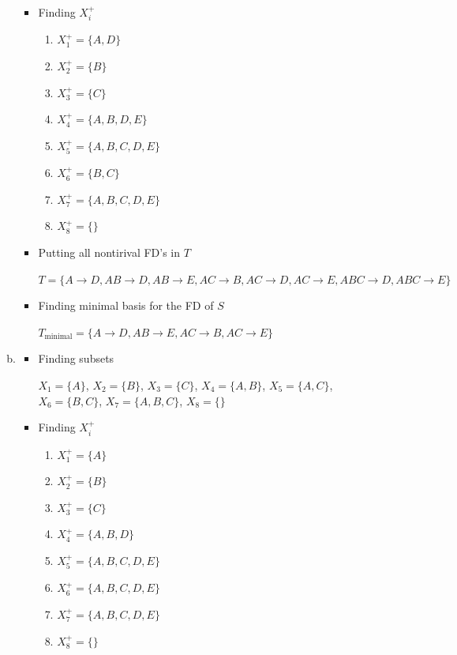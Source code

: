 \documentclass[12pt]{article}
\begin{document}
\begin{enumerate}[1.]
\begin{enumerate}[a)]
\begin{itemize}
            \item Finding $X_i^+$
            \begin{enumerate}[1.]
                \item $X_1^+ = \{A,D\}$
                \item $X_2^+ = \{B\}$
                \item $X_3^+ = \{C\}$
                \item $X_4^+ = \{A,B,D,E\}$
                \item $X_5^+ = \{A,B,C,D,E\}$
                \item $X_6^+ = \{B,C\}$
                \item $X_7^+ = \{A,B,C,D,E\}$
                \item $X_8^+ = \{\}$
            \end{enumerate}

            \item Putting all nontirival FD's in $T$

            $T = \{A \to D, AB \to D, AB \to E, AC \to B, AC \to D, AC \to E,
                   ABC \to D, ABC \to E\}$

            \item Finding minimal basis for the FD of $S$

            $T_{\text{minimal}} = \{A \to D, AB \to E, AC \to B, AC \to E\}$

        \end{itemize}

        \item

        \begin{itemize}
            \item Finding subsets

            $X_1 = \{A\}$, $X_2 = \{B\}$, $X_3 = \{C\}$, $X_4 = \{A,B\}$, $X_5 = \{A,C\}$,
            $X_6 = \{B,C\}$, $X_7 = \{A,B,C\}$, $X_8 = \{\}$


            \item Finding $X_i^+$
            \begin{enumerate}[1.]
                \item $X_1^+ = \{A\}$
                \item $X_2^+ = \{B\}$
                \item $X_3^+ = \{C\}$
                \item $X_4^+ = \{A,B,D\}$
                \item $X_5^+ = \{A,B,C,D,E\}$
                \item $X_6^+ = \{A,B,C,D,E\}$
                \item $X_7^+ = \{A,B,C,D,E\}$
                \item $X_8^+ = \{\}$
            \end{enumerate}


\end{itemize}
\end{enumerate}
\end{enumerate}
\end{document}
